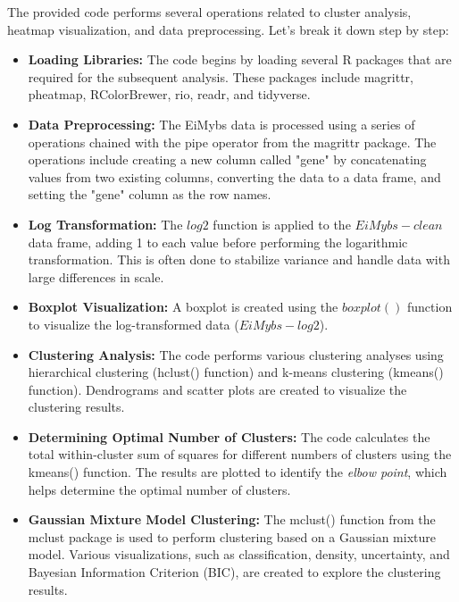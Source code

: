 \documentclass{article}
\begin{document}
The provided code performs several operations related to cluster analysis, heatmap visualization, and data preprocessing. Let's break it down step by step:
\begin{itemize}

\item \textbf{Loading Libraries: } The code begins by loading several R packages that are required for the subsequent analysis. These packages include magrittr, pheatmap, RColorBrewer, rio, readr, and tidyverse.


\item \textbf{Data Preprocessing: } The EiMybs data is processed using a series of operations chained with the pipe operator from the magrittr package. The operations include creating a new column called "gene" by concatenating values from two existing columns, converting the data to a data frame, and setting the "gene" column as the row names.


\item \textbf{Log Transformation: } The $log2$ function is applied to the $EiMybs-clean$ data frame, adding 1 to each value before performing the logarithmic transformation. This is often done to stabilize variance and handle data with large differences in scale.

\item \textbf{Boxplot Visualization: } A boxplot is created using the $boxplot()$ function to visualize the log-transformed data ($EiMybs-log2$).

\item \textbf{Clustering Analysis: } The code performs various clustering analyses using hierarchical clustering (hclust() function) and k-means clustering (kmeans() function). Dendrograms and scatter plots are created to visualize the clustering results.

\item \textbf{Determining Optimal Number of Clusters:} The code calculates the total within-cluster sum of squares for different numbers of clusters using the kmeans() function. The results are plotted to identify the \textit{elbow point}, which helps determine the optimal number of clusters.

\item \textbf{Gaussian Mixture Model Clustering:} The mclust() function from the mclust package is used to perform clustering based on a Gaussian mixture model. Various visualizations, such as classification, density, uncertainty, and Bayesian Information Criterion (BIC), are created to explore the clustering results.
\end{itemize}
\end{document}
